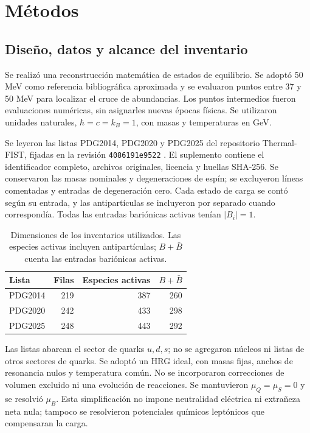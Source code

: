 \section{Métodos}
\subsection{Diseño, datos y alcance del inventario}
Se realizó una reconstrucción matemática de estados de equilibrio. Se adoptó 50 MeV como referencia bibliográfica aproximada y se evaluaron puntos entre 37 y 50 MeV para localizar el cruce de abundancias. Los puntos intermedios fueron evaluaciones numéricas, sin asignarles nuevas épocas físicas. Se utilizaron unidades naturales, $\hbar=c=k_B=1$, con masas y temperaturas en GeV.

Se leyeron las listas PDG2014, PDG2020 y PDG2025 del repositorio Thermal-FIST, fijadas en la revisión \texttt{4086191e9522} \citep{TFLists2026}. El suplemento contiene el identificador completo, archivos originales, licencia y huellas SHA-256. Se conservaron las masas nominales y degeneraciones de espín; se excluyeron líneas comentadas y entradas de degeneración cero. Cada estado de carga se contó según su entrada, y las antipartículas se incluyeron por separado cuando correspondía. Todas las entradas bariónicas activas tenían $|B_i|=1$.

\begin{table}[t]
\centering\small
\caption{Dimensiones de los inventarios utilizados. Las especies activas incluyen antipartículas; $B+\bar B$ cuenta las entradas bariónicas activas.}
\label{tab:inventory}
\setlength{\tabcolsep}{4pt}
\begin{tabular}{lrrr}\toprule
Lista & Filas & Especies activas & $B+\bar B$\\\midrule
PDG2014 & 219 & 387 & 260\\
PDG2020 & 242 & 433 & 298\\
PDG2025 & 248 & 443 & 292\\
\bottomrule\end{tabular}
\end{table}

Las listas abarcan el sector de quarks $u,d,s$; no se agregaron núcleos ni listas de otros sectores de quarks. Se adoptó un HRG ideal, con masas fijas, anchos de resonancia nulos y temperatura común. No se incorporaron correcciones de volumen excluido ni una evolución de reacciones. Se mantuvieron $\mu_Q=\mu_S=0$ y se resolvió $\mu_B$. Esta simplificación no impone neutralidad eléctrica ni extrañeza neta nula; tampoco se resolvieron potenciales químicos leptónicos que compensaran la carga.

